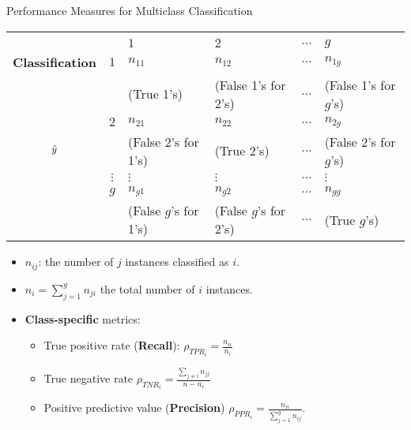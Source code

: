 \documentclass[11pt,compress,t,notes=noshow, xcolor=table]{beamer}
\begin{document}
\begin{vbframe}{Performance Measures for Multiclass Classification}
	\small{
		\begin{center}
			\tiny
			\begin{tabular}{cc|>{\centering\arraybackslash}p{8em}>{\centering\arraybackslash}p{8em}>{\centering\arraybackslash}p{5em}>{\centering\arraybackslash}p{8em}}
				& & \multicolumn{4}{c}{\bfseries True Class $y$} \\
				& & $1$ & $2$ & $\ldots$ & $g$  \\
				\hline
				\bfseries Classification     & $1$ & $n_{11}$  &  $n_{12}$  & $\ldots$ &  $n_{1g}$ \\
				& & (True 1's) & (False 1's for 2's) & $\ldots$ &  (False 1's for $g$'s)  \\
				& $2$ &  $n_{21}$  &  $n_{22}$  & $\ldots$ & $n_{2g}$  \\
				$\hat{y}$ & & (False 2's for 1's) & (True 2's) & $\ldots$ &  (False 2's for $g$'s)  \\
				& $\vdots$ & $\vdots$ & $\vdots$ & $\ldots$ & $\vdots$ \\
				& $g$ & $n_{g1}$ & $n_{g2}$  & $\ldots$ &  $n_{gg}$\\
				& & (False $g$'s for 1's) & (False $g$'s for 2's) & $\ldots$ &  (True $g$'s)  \\
			\end{tabular}
		\end{center}
		
		\begin{itemize}
			\item $n_{ij}$: the number of $j$ instances classified as $i$.

            \item $n_i = \sum_{j=1}^g n_{ji}$ the total number of $i$ instances.

            \item \textbf{Class-specific} metrics:
                \begin{itemize}
                    \small
                    
                    \item True positive rate (\textbf{Recall}): $\rho_{TPR_i} = \frac{n_{ii}}{n_i}$
    
                    \item True negative rate $\rho_{TNR_i} = \frac{\sum_{j\neq i}n_{jj}}{n-n_i}$ 
    
                    \item Positive predictive value (\textbf{Precision}) $\rho_{PPR_i} = \frac{n_{ii}}{\sum_{j=1}^g n_{ij}}$.
                    
                \end{itemize}

		\end{itemize}
	}
\end{vbframe}
\end{document}
